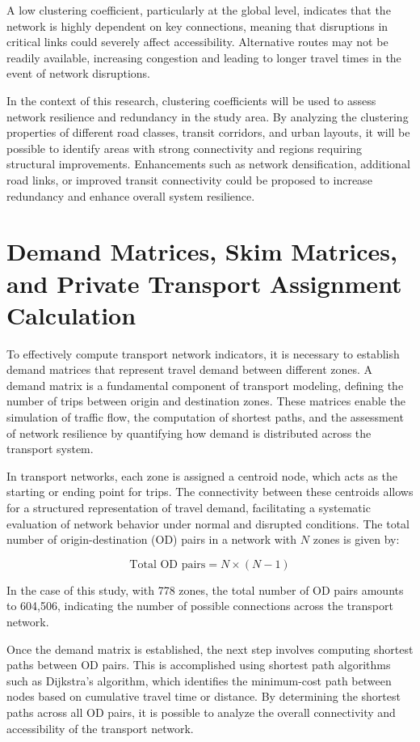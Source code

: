 A low clustering coefficient, particularly at the global level, indicates that the network is highly dependent on key connections, meaning that disruptions in critical links could severely affect accessibility. Alternative routes may not be readily available, increasing congestion and leading to longer travel times in the event of network disruptions.

In the context of this research, clustering coefficients will be used to assess network resilience and redundancy in the study area. By analyzing the clustering properties of different road classes, transit corridors, and urban layouts, it will be possible to identify areas with strong connectivity and regions requiring structural improvements. Enhancements such as network densification, additional road links, or improved transit connectivity could be proposed to increase redundancy and enhance overall system resilience.

\section{Demand Matrices, Skim Matrices, and Private Transport Assignment Calculation}
To effectively compute transport network indicators, it is necessary to establish demand matrices that represent travel demand between different zones. A demand matrix is a fundamental component of transport modeling, defining the number of trips between origin and destination zones. These matrices enable the simulation of traffic flow, the computation of shortest paths, and the assessment of network resilience by quantifying how demand is distributed across the transport system.

In transport networks, each zone is assigned a centroid node, which acts as the starting or ending point for trips. The connectivity between these centroids allows for a structured representation of travel demand, facilitating a systematic evaluation of network behavior under normal and disrupted conditions. The total number of origin-destination (OD) pairs in a network with \( N \) zones is given by:

\begin{equation}
\text{Total OD pairs} = N \times (N - 1)
\end{equation}

In the case of this study, with 778 zones, the total number of OD pairs amounts to 604,506, indicating the number of possible connections across the transport network.

Once the demand matrix is established, the next step involves computing shortest paths between OD pairs. This is accomplished using shortest path algorithms such as Dijkstra’s algorithm, which identifies the minimum-cost path between nodes based on cumulative travel time or distance. By determining the shortest paths across all OD pairs, it is possible to analyze the overall connectivity and accessibility of the transport network.

